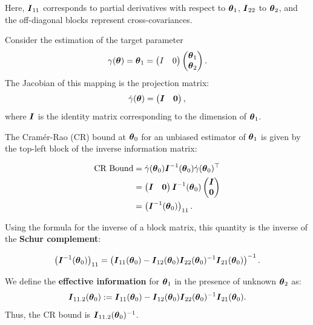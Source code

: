 Here, $\boldsymbol{I}_{11}$ corresponds to partial derivatives with respect to $\boldsymbol{\theta}_1$, $\boldsymbol{I}_{22}$ to $\boldsymbol{\theta}_2$, and the off-diagonal blocks represent cross-covariances.

Consider the estimation of the target parameter \[
	\gamma(\boldsymbol{\theta}) = \boldsymbol{\theta}_1
    = \begin{pmatrix} I & 0 \end{pmatrix} \begin{pmatrix} \boldsymbol{\theta}_{1}\\\boldsymbol{\theta}_{2} \end{pmatrix}.
\]The Jacobian of this mapping is the projection matrix:
\[
\dot{\gamma}(\boldsymbol{\theta}) = \begin{pmatrix} \boldsymbol{I} & \boldsymbol{0} \end{pmatrix},
\]
where $\boldsymbol{I}$ is the identity matrix corresponding to the dimension of $\boldsymbol{\theta}_1$.

The Cram\'er-Rao (CR) bound at $\boldsymbol{\theta}_0$ for an unbiased estimator of $\boldsymbol{\theta}_1$ is given by the top-left block of the inverse information matrix:

\[
\begin{split} 
\text{CR Bound} &= \dot{\gamma}(\boldsymbol{\theta}_0) \boldsymbol{I}^{-1}(\boldsymbol{\theta}_0) \dot{\gamma}(\boldsymbol{\theta}_0)^\top \\
&= \begin{pmatrix} \boldsymbol{I} & \boldsymbol{0} \end{pmatrix} \boldsymbol{I}^{-1}(\boldsymbol{\theta}_0) \begin{pmatrix} \boldsymbol{I} \\ \boldsymbol{0} \end{pmatrix} \\ 
&= \left( \boldsymbol{I}^{-1}(\boldsymbol{\theta}_0) \right)_{11}.
\end{split}
\]

Using the formula for the inverse of a block matrix, this quantity is the inverse of the \textbf{Schur complement}:

\[
\left( \boldsymbol{I}^{-1}(\boldsymbol{\theta}_0) \right)_{11} = \left( \boldsymbol{I}_{11}(\boldsymbol{\theta}_0) - \boldsymbol{I}_{12}(\boldsymbol{\theta}_0) \boldsymbol{I}_{22}(\boldsymbol{\theta}_0)^{-1} \boldsymbol{I}_{21}(\boldsymbol{\theta}_0) \right)^{-1}.
\]

We define the \textbf{effective information} for $\boldsymbol{\theta}_1$ in the presence of unknown $\boldsymbol{\theta}_2$ as:
\[
\boldsymbol{I}_{11.2}(\boldsymbol{\theta}_0) := \boldsymbol{I}_{11}(\boldsymbol{\theta}_0) - \boldsymbol{I}_{12}(\boldsymbol{\theta}_0)\boldsymbol{I}_{22}(\boldsymbol{\theta}_0)^{-1}\boldsymbol{I}_{21}(\boldsymbol{\theta}_0).
\]
Thus, the CR bound is $\boldsymbol{I}_{11.2}(\boldsymbol{\theta}_0)^{-1}$.

